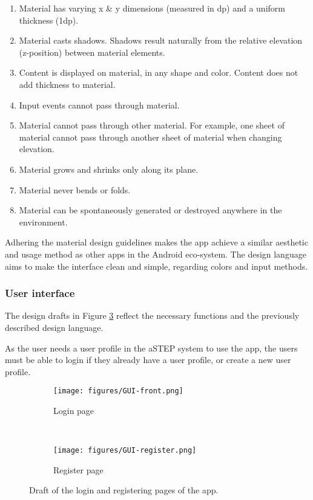 \begin{enumerate}
	\item Material has varying x \& y dimensions (measured in dp) and a uniform thickness (1dp).
	\item Material casts shadows. Shadows result naturally from the relative elevation (z-position) between material elements.
	\item Content is displayed on material, in any shape and color. Content does not add thickness to material.
	\item Input events cannot pass through material.
	\item Material cannot pass through other material. For example, one sheet of material cannot pass through another sheet of material when changing elevation.
	\item Material grows and shrinks only along its plane.
	\item Material never bends or folds.
	\item Material can be spontaneously generated or destroyed anywhere in the environment.
\end{enumerate} 

Adhering the material design guidelines makes the app achieve a similar aesthetic and usage method as other apps in the Android eco-system. 
The design language aims to make the interface clean and simple, regarding colors and input methods.

\subsubsection{User interface}
The design drafts in Figure \ref{fig:GUI-firstrun} reflect the necessary functions and the previously described design language. 

As the user needs a user profile in the aSTEP system to use the app, the users must be able to login if they already have a user profile, or create a new user profile.

\begin{figure}[h!]
	 \centering
	 \begin{subfigure}[b]{0.3\textwidth}
	 	\texttt{[image: figures/GUI-front.png]}
	 	\caption{Login page}
	 	\label{fig:GUI-front}
	 \end{subfigure}
	 ~ %
	 \begin{subfigure}[b]{0.3\textwidth}
	 	\texttt{[image: figures/GUI-register.png]}
	 	\caption{Register page}
	 	\label{fig:GUI-register}
	 \end{subfigure}
	 \caption{Draft of the login and registering pages of the app.}\label{fig:GUI-firstrun}
\end{figure}

